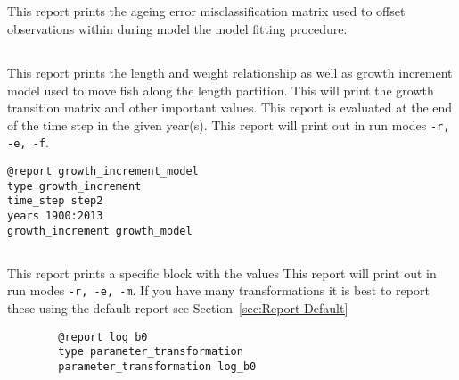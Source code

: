 \subsection{}\label{sec:Report-AgeingErrorMatrix}

This report prints the ageing error misclassification matrix used to offset observations within during model the model fitting procedure.


\else

\subsection{}\label{sec:Report-GrowthIncrement}

This report prints the length and weight relationship as well as growth increment model used to move fish along the length partition. This will print the growth transition matrix and other important values. This report is evaluated at the end of the time step in the given year(s). This report will print out in run modes \texttt{-r, -e, -f}.

\begin{verbatim}
@report growth_increment_model
type growth_increment
time_step step2
years 1900:2013
growth_increment growth_model
\end{verbatim}

\fi %

\subsection{}\label{sec:Report-ParameterTransformations}

This report prints a specific  block with the values This report will print out in run modes \texttt{-r, -e, -m}. If you have many transformations it is best to report these using the default report see Section~\ref{sec:Report-Default}

{\small{\begin{verbatim}
		@report log_b0
		type parameter_transformation
		parameter_transformation log_b0
		\end{verbatim}}}

\subsection{}\label{sec:Report-Process}

